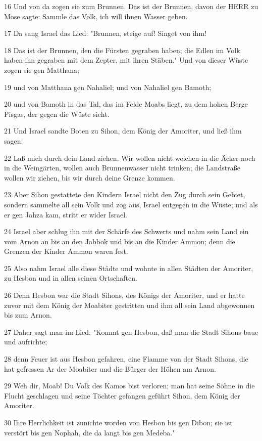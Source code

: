 \par 16 Und von da zogen sie zum Brunnen. Das ist der Brunnen, davon der HERR zu Mose sagte: Sammle das Volk, ich will ihnen Wasser geben.
\par 17 Da sang Israel das Lied: "Brunnen, steige auf! Singet von ihm!
\par 18 Das ist der Brunnen, den die Fürsten gegraben haben; die Edlen im Volk haben ihn gegraben mit dem Zepter, mit ihren Stäben." Und von dieser Wüste zogen sie gen Matthana;
\par 19 und von Matthana gen Nahaliel; und von Nahaliel gen Bamoth;
\par 20 und von Bamoth in das Tal, das im Felde Moabs liegt, zu dem hohen Berge Pisgas, der gegen die Wüste sieht.
\par 21 Und Israel sandte Boten zu Sihon, dem König der Amoriter, und ließ ihm sagen:
\par 22 Laß mich durch dein Land ziehen. Wir wollen nicht weichen in die Äcker noch in die Weingärten, wollen auch Brunnenwasser nicht trinken; die Landstraße wollen wir ziehen, bis wir durch deine Grenze kommen.
\par 23 Aber Sihon gestattete den Kindern Israel nicht den Zug durch sein Gebiet, sondern sammelte all sein Volk und zog aus, Israel entgegen in die Wüste; und als er gen Jahza kam, stritt er wider Israel.
\par 24 Israel aber schlug ihn mit der Schärfe des Schwerts und nahm sein Land ein vom Arnon an bis an den Jabbok und bis an die Kinder Ammon; denn die Grenzen der Kinder Ammon waren fest.
\par 25 Also nahm Israel alle diese Städte und wohnte in allen Städten der Amoriter, zu Hesbon und in allen seinen Ortschaften.
\par 26 Denn Hesbon war die Stadt Sihons, des Königs der Amoriter, und er hatte zuvor mit dem König der Moabiter gestritten und ihm all sein Land abgewonnen bis zum Arnon.
\par 27 Daher sagt man im Lied: "Kommt gen Hesbon, daß man die Stadt Sihons baue und aufrichte;
\par 28 denn Feuer ist aus Hesbon gefahren, eine Flamme von der Stadt Sihons, die hat gefressen Ar der Moabiter und die Bürger der Höhen am Arnon.
\par 29 Weh dir, Moab! Du Volk des Kamos bist verloren; man hat seine Söhne in die Flucht geschlagen und seine Töchter gefangen geführt Sihon, dem König der Amoriter.
\par 30 Ihre Herrlichkeit ist zunichte worden von Hesbon bis gen Dibon; sie ist verstört bis gen Nophah, die da langt bis gen Medeba."
